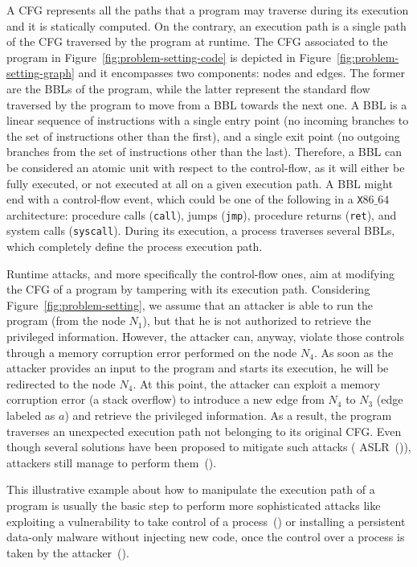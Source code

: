 A CFG represents all the paths that a program
may traverse during its execution and it is statically computed. 
On the contrary, an execution path is a single path of the CFG traversed by the 
program at runtime. 
The CFG associated to the program in Figure~\ref{fig:problem-setting-code} is 
depicted in
Figure~\ref{fig:problem-setting-graph} and it encompasses two components: nodes 
and edges. The former are the BBLs of the program, while the latter represent 
the standard flow traversed by the program to move from a BBL towards the next 
one. A BBL is a linear sequence of instructions with a single entry point
(\ie no incoming branches to the set of instructions other than the first), 
and a single exit point (\ie no outgoing branches from the set of instructions 
other than the last). Therefore, a BBL can be considered an atomic unit with 
respect to the control-flow, as it will either be fully executed, or not 
executed at all on a given execution path.
A BBL might end with a control-flow event, which could be one of the following 
in a \texttt{X$86\_64$} architecture: procedure calls (\eg \texttt{call}), 
jumps (\eg \texttt{jmp}), procedure returns (\eg \texttt{ret}), and system 
calls (\eg \texttt{syscall}). 
During its execution, a process traverses several BBLs, which completely define 
the process execution path.

Runtime attacks, and more specifically the control-flow ones, aim at modifying 
the CFG of a program by tampering with its execution path.
Considering Figure~\ref{fig:problem-setting}, we assume that an attacker is 
able to run the program (from the node $N_1$), but that he is not authorized to 
retrieve the privileged information.
However, the attacker can, anyway, violate those controls through a memory 
corruption error performed on the node $N_4$.
As soon as the attacker provides an input to the program and starts its 
execution, he will be redirected to the node $N_4$.
At this point, the attacker can exploit a memory corruption error (\eg a stack 
overflow) to introduce a new edge from $N_4$ to $N_3$ (edge labeled as $a$) and 
retrieve the privileged information.
As a result, the program traverses an unexpected execution path not belonging 
to its original CFG.
Even though several solutions have been proposed to mitigate such attacks (\eg 
ASLR~(\cite{kil2006address})), attackers still manage to perform 
them~(\cite{van2012memory}). 

This illustrative example about how to manipulate the execution path of a 
program is usually the basic step to perform more sophisticated attacks like
exploiting a vulnerability to take control of a 
process~(\cite{yuan2015hardware}) 
or installing a persistent data-only malware without injecting new code, 
once the control over a process is taken by the 
attacker~(\cite{vogl2014persistent}).

